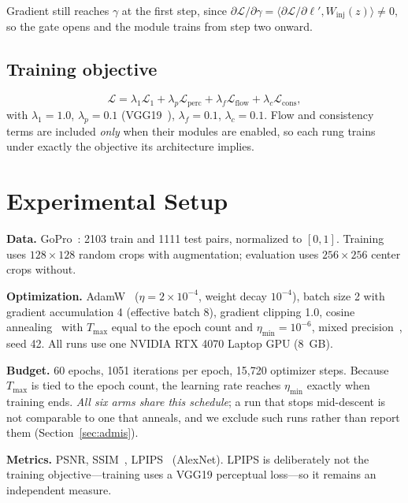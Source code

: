 \documentclass[conference]{IEEEtran}
\newcommand{\bs}[1]{\textbf{#1}}
\begin{document}
Gradient still reaches $\gamma$ at the first step, since
$\partial\mathcal{L}/\partial\gamma = \langle \partial\mathcal{L}/\partial\ell',
W_{\text{inj}}(z)\rangle \neq 0$, so the gate opens and the module trains from
step two onward.

\subsection{Training objective}
\begin{equation}
\mathcal{L} = \lambda_1 \mathcal{L}_{1}
            + \lambda_p \mathcal{L}_{\text{perc}}
            + \lambda_f \mathcal{L}_{\text{flow}}
            + \lambda_c \mathcal{L}_{\text{cons}},
\label{eq:total}
\end{equation}
with $\lambda_1=1.0$, $\lambda_p=0.1$ (VGG19~\cite{vgg}), $\lambda_f=0.1$,
$\lambda_c=0.1$. Flow and consistency terms are included \emph{only} when their
modules are enabled, so each rung trains under exactly the objective its
architecture implies.

\section{Experimental Setup}
\label{sec:setup}

\bs{Data.} GoPro~\cite{gopro}: 2103 train and 1111 test pairs, normalized to
$[0,1]$. Training uses $128\times128$ random crops with augmentation;
evaluation uses $256\times256$ center crops without.

\bs{Optimization.} AdamW~\cite{adamw} ($\eta=2\times10^{-4}$, weight decay
$10^{-4}$), batch size 2 with gradient accumulation 4 (effective batch 8),
gradient clipping 1.0, cosine annealing~\cite{sgdr} with $T_{\max}$ equal to
the epoch count and $\eta_{\min}=10^{-6}$, mixed precision~\cite{amp}, seed 42.
All runs use one NVIDIA RTX 4070 Laptop GPU (8~GB).

\bs{Budget.} 60 epochs, 1051 iterations per epoch, 15{,}720 optimizer steps.
Because $T_{\max}$ is tied to the epoch count, the learning rate reaches
$\eta_{\min}$ exactly when training ends. \emph{All six arms share this
schedule}; a run that stops mid-descent is not comparable to one that anneals,
and we exclude such runs rather than report them (Section~\ref{sec:admis}).

\bs{Metrics.} PSNR, SSIM~\cite{ssim}, LPIPS~\cite{lpips} (AlexNet). LPIPS is
deliberately not the training objective---training uses a VGG19 perceptual
loss---so it remains an independent measure.
\end{document}
